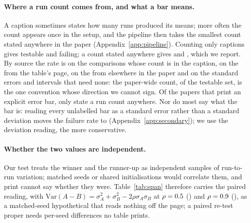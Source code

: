 \documentclass{article}
\begin{document}
\paragraph{Where a run count comes from, and what a bar means.} A caption
sometimes states how many runs produced its means; more often the count
appears once in the setup, and the pipeline then takes the smallest count
stated anywhere in the paper (Appendix~\ref{app:pipeline}). Counting only
captions gives \nStrictTestable{} testable and \nStrictFail{} failing; a
count stated anywhere gives \nPctTestable{} and \nPctFail{}, which we
report. By source the rate is \nFailRunsFromCaption{} on the
\nNRunsFromCaption{} comparisons whose count is in the caption,
\nFailRunsFromPage{} on the \nNRunsFromPage{} from the table's page,
\nFailRunsFromPaper{} on the \nNRunsFromPaper{} from elsewhere in the paper
and \nFailRunsFromNone{} on the \nNRunsFromNone{} standard errors and
intervals that need none: the paper-wide count, \nPctRunsFromPaper{} of the
testable set, is the one convention whose direction we cannot sign.
Of the papers that print an explicit error bar, only
\nPctErrorBarPapersStatingRuns{} state a run count anywhere. Nor do most say
what the bar is: reading every unlabelled bar as a standard error rather than a
standard deviation moves the failure rate to \nUnlabelledAsSemFull{}
(Appendix~\ref{app:secondary}); we use the deviation reading, the more
conservative.

\paragraph{Whether the two values are independent.} Our test treats the winner
and the runner-up as independent samples of run-to-run variation; matched
seeds or shared initialisations would correlate them, and print cannot say
whether they were. Table~\ref{tab:span} therefore carries the paired reading, with
$\mathrm{Var}(A - B) = \sigma_A^2 + \sigma_B^2 - 2\rho\sigma_A\sigma_B$ at
$\rho = 0.5{}$ (\nFailRhoHalf{}) and $\rho = 0.9{}$
(\nFailRhoNine{}), as a matched-seed hypothetical that reads nothing off the
page; a paired re-test proper needs per-seed differences no table prints.
\end{document}
